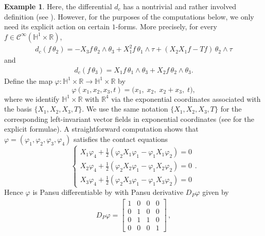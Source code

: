 \documentclass[dvipsnames]{amsart}
\theoremstyle{definition}
\newtheorem{example}[theorem]{Example}
\theoremstyle{definition}
\numberwithin{equation}{section}
\begin{document}
\begin{example}
    Here, the differential $d_c$ has a nontrivial and rather involved definition (see \cite[Theorem 3.11]{FranchiTesi}). However, for the purposes of the computations below, we only need its explicit action on certain $1$-forms. More precisely, for every $f \in \mathcal{C}^{\infty}(\mathbb{H}^1 \times \mathbb{R})$,
    \begin{align*}
        d_c(f \,\theta_2) = -X_3f\, \theta_2 \wedge \theta_3 + X_1^2f \,\theta_1 \wedge \tau + (X_2X_1f-Tf)\,\theta_2 \wedge \tau 
    \end{align*}
    and
    \begin{align*}
        d_c(f\,\theta_3) = X_1f \, \theta_1 \wedge \theta_3 + X_2f \, \theta_2 \wedge \theta_3.
    \end{align*}
     Define the map $\varphi : \mathbb{H}^1 \times \mathbb{R} \to \mathbb{H}^1 \times \mathbb{R}$ by
\begin{equation*}
\varphi(x_1,x_2,x_3,t)
=
\Big(x_1,\; x_2,\; x_2+x_3,\; t\Big),
\end{equation*}
    where we identify $\mathbb{H}^1 \times \mathbb{R}$ with $\mathbb{R}^4$ via the exponential coordinates associated with the basis $\{X_1, X_2, X_3, T\}$. We use the same notation $\{X_1, X_2, X_3,T\}$ for the corresponding left-invariant vector fields in exponential coordinates (see \cite{LeDonneTripaldi2021} for the explicit formulae).
    A straightforward computation shows that $\varphi = (\varphi_1,\varphi_2, \varphi_3, \varphi_4)$ satisfies the contact equations
     \begin{equation*}
\begin{cases}
    X_1\varphi_4 + \frac{1}{2}(\varphi_2 X_1\varphi_1 - \varphi_1 X_1\varphi_2) = 0 \\
    X_2\varphi_4 + \frac{1}{2}(\varphi_2 X_2\varphi_1 - \varphi_1 X_2\varphi_2) = 0\\
    X_3\varphi_4 + \frac{1}{2}(\varphi_2 X_3\varphi_1 - \varphi_1 X_3\varphi_2) = 0
\end{cases}.
\end{equation*}
Hence $\varphi$ is Pansu differentiable by \cite[Theorem 1.1]{Magnani_2013} with Pansu derivative $D_P\varphi$ given by
 \begin{align*}
        D_P\varphi=\begin{bmatrix}
        1 & 0 & 0& 0\\
        0 & 1 & 0 & 0\\ 
        0 & 1 & 1 & 0\\ 
        0 & 0 & 0 & 1\end{bmatrix}\,,

\end{align*}
\end{example}
\end{document}
